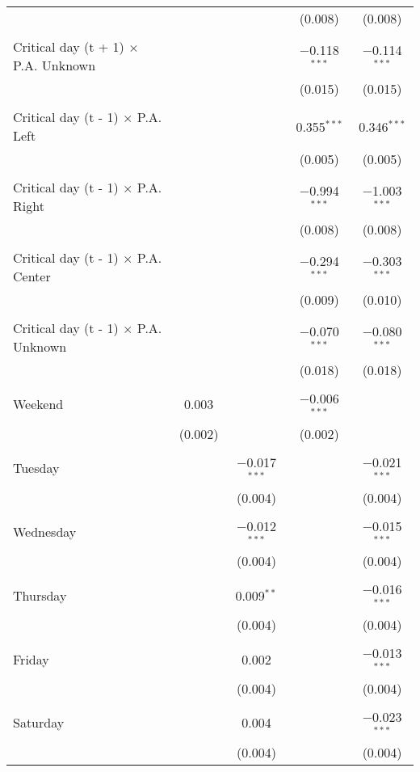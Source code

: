 \documentclass[
]{article}
\begin{document}
\begin{table}[!htbp]
{\begin{tabular}{@{\extracolsep{5pt}}lcccc}
  &  &  & (0.008) & (0.008) \\ 
  & & & & \\ 
 Critical day (t + 1) $\times$ P.A. Unknown &  &  & $-$0.118$^{***}$ & $-$0.114$^{***}$ \\ 
  &  &  & (0.015) & (0.015) \\ 
  & & & & \\ 
 Critical day (t - 1) $\times$ P.A. Left &  &  & 0.355$^{***}$ & 0.346$^{***}$ \\ 
  &  &  & (0.005) & (0.005) \\ 
  & & & & \\ 
 Critical day (t - 1) $\times$ P.A. Right &  &  & $-$0.994$^{***}$ & $-$1.003$^{***}$ \\ 
  &  &  & (0.008) & (0.008) \\ 
  & & & & \\ 
 Critical day (t - 1) $\times$ P.A. Center &  &  & $-$0.294$^{***}$ & $-$0.303$^{***}$ \\ 
  &  &  & (0.009) & (0.010) \\ 
  & & & & \\ 
 Critical day (t - 1) $\times$ P.A. Unknown &  &  & $-$0.070$^{***}$ & $-$0.080$^{***}$ \\ 
  &  &  & (0.018) & (0.018) \\ 
  & & & & \\ 
 Weekend & 0.003 &  & $-$0.006$^{***}$ &  \\ 
  & (0.002) &  & (0.002) &  \\ 
  & & & & \\ 
 Tuesday &  & $-$0.017$^{***}$ &  & $-$0.021$^{***}$ \\ 
  &  & (0.004) &  & (0.004) \\ 
  & & & & \\ 
 Wednesday &  & $-$0.012$^{***}$ &  & $-$0.015$^{***}$ \\ 
  &  & (0.004) &  & (0.004) \\ 
  & & & & \\ 
 Thursday &  & 0.009$^{**}$ &  & $-$0.016$^{***}$ \\ 
  &  & (0.004) &  & (0.004) \\ 
  & & & & \\ 
 Friday &  & 0.002 &  & $-$0.013$^{***}$ \\ 
  &  & (0.004) &  & (0.004) \\ 
  & & & & \\ 
 Saturday &  & 0.004 &  & $-$0.023$^{***}$ \\ 
  &  & (0.004) &  & (0.004) \\ 

\end{tabular}}
\end{table}
\end{document}
